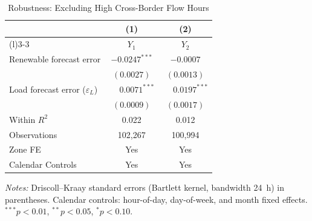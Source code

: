 \documentclass{article}
\begin{document}
\begin{table}[htbp]
\centering
\caption{Robustness: Excluding High Cross-Border Flow Hours}
\label{tab:r2_flow}
\begin{threeparttable}
\begin{tabularx}{\linewidth}{>{\raggedright\arraybackslash}Xcc}
\toprule
 & (1) & (2) \\
\cmidrule(r){2-2}\cmidrule(l){3-3}
 & $Y_1$ & $Y_2$ \\
\midrule
Renewable forecast error & $-0.0247^{***}$ & $-0.0007$ \\
 & $(0.0027)$ & $(0.0013)$ \\[0.4ex]
Load forecast error ($\varepsilon_L$) & $\phantom{-}0.0071^{***}$ & $\phantom{-}0.0197^{***}$ \\
 & $(0.0009)$ & $(0.0017)$ \\
\midrule
Within $R^2$ & 0.022 & 0.012 \\
Observations & 102,267 & 100,994 \\
Zone FE & Yes & Yes \\
Calendar Controls & Yes & Yes \\
\bottomrule
\end{tabularx}
\begin{tablenotes}[flushleft]
\footnotesize
\item \textit{Notes:} Driscoll--Kraay standard errors (Bartlett kernel, bandwidth 24~h) in parentheses. Calendar controls: hour-of-day, day-of-week, and month fixed effects. $^{***}p<0.01$, $^{**}p<0.05$, $^{*}p<0.10$.
\end{tablenotes}
\end{threeparttable}
\end{table}
\end{document}

